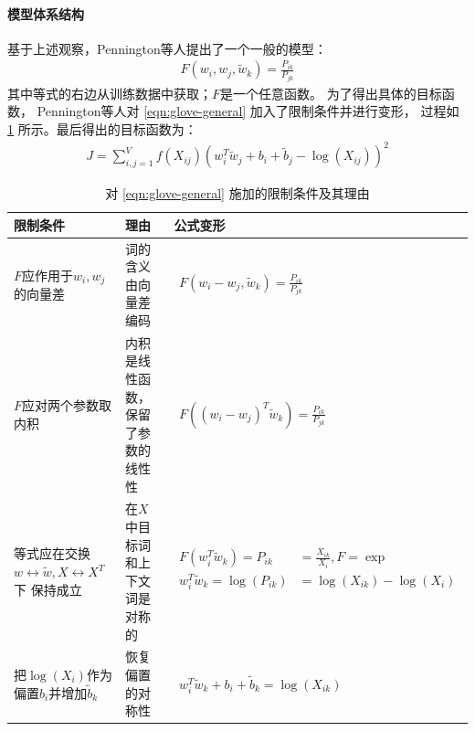 \paragraph{模型体系结构}
基于上述观察，Pennington等人提出了一个一般的模型：
\begin{align}
  F(w_i,w_j,\tilde{w}_k) = \frac{P_{ik}}{P_{jk}}
  \label{eqn:glove-general}
\end{align}
其中等式的右边从训练数据中获取；$F$是一个任意函数。
为了得出具体的目标函数，
Pennington等人对 \cref{eqn:glove-general} 加入了限制条件并进行变形，
过程如 \cref{tab:glove-constrains} 所示。最后得出的目标函数为：
\begin{align}
  J = \sum_{i,j=1}^V f\left(X_{ij}\right) \left(w_i^T\tilde{w}_j+b_i+\tilde{b}_j-\log(X_{ij})\right)^2
  \label{eqn:glove-objective}
\end{align}

\begin{table}
  \setlength{\tabcolsep}{6pt}
  \renewcommand{\arraystretch}{1.5}
  \centering
  \caption{对 \cref{eqn:glove-general} 施加的限制条件及其理由}
  \label{tab:glove-constrains}
  \begin{tabular}{p{}p{}p{}}
    \toprule
    限制条件 & 理由 & 公式变形 \\
    \midrule
    $F$应作用于$w_i, w_j$的向量差 & 词的含义由向量差编码 &
    $\begin{aligned}
      F(w_i - w_j, \tilde{w}_k) = \frac{P_{ik}}{P_{jk}}
    \end{aligned}$ \\
    $F$应对两个参数取内积 & 内积是线性函数，保留了参数的线性性 &
    $\begin{aligned}
      F\left(( w_i - w_j )^T \tilde{w}_k\right) = \frac{P_{ik}}{P_{jk}}
    \end{aligned}$ \\
    等式应在交换$w \leftrightarrow \tilde{w}, X \leftrightarrow X^T$下
    保持成立 & 在$X$中目标词和上下文词是对称的 &
    $\begin{aligned}
      F(w_i^T\tilde{w}_k) = P_{ik} &= \frac{X_{ik}}{X_i}, F=\exp \\
      w_i^T\tilde{w}_k = \log(P_{ik}) &= \log(X_{ik}) - \log(X_i) \\
    \end{aligned} $ \\
    把$\log(X_i)$作为偏置$b_i$并增加$\tilde{b}_k$ & 恢复偏置的对称性 &
    $\begin{aligned}
      w_i^T\tilde{w}_k + b_i + \tilde{b}_k = \log(X_{ik})
    \end{aligned}$ \\
    \bottomrule
  \end{tabular}
\end{table}

